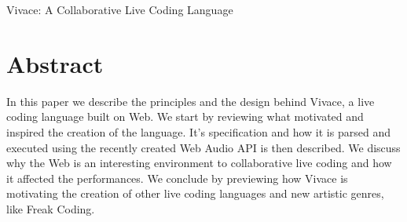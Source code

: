 \documentclass[letterpaper, 12pt]{article}
\begin{document}
\vspace*{24pt}
\vspace*{24pt}
 {\cmjTitle Vivace: A Collaborative Live Coding Language}

\section*{Abstract}

In this paper we describe the principles and the design behind Vivace, a live coding language built on Web. We start by reviewing what motivated and inspired the creation of the language. It's specification and how it is parsed and executed using the recently created Web Audio API is then described. We discuss why the Web is an interesting environment to collaborative live coding and how it affected the performances. We conclude by previewing how Vivace is motivating the creation of other live coding languages and new artistic genres, like Freak Coding.

\section*{} %
\end{document}
